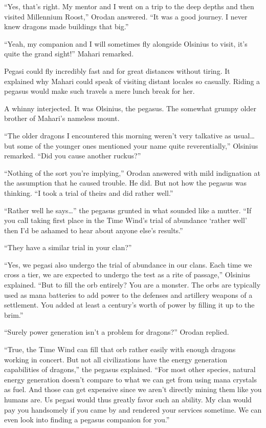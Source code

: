 \documentclass[a4paper,10pt]{book}
\begin{document}
“Yes, that’s right. My mentor and I went on a trip to the deep depths and then visited Millennium Roost,” Orodan answered. “It was a good journey. I never knew dragons made buildings that big.”\par
“Yeah, my companion and I will sometimes fly alongside Olsinius to visit, it’s quite the grand sight!” Mahari remarked.\par
Pegasi could fly incredibly fast and for great distances without tiring. It explained why Mahari could speak of visiting distant locales so casually. Riding a pegasus would make such travels a mere lunch break for her.\par
A whinny interjected. It was Olsinius, the pegasus. The somewhat grumpy older brother of Mahari’s nameless mount.\par
“The older dragons I encountered this morning weren’t very talkative as usual… but some of the younger ones mentioned your name quite reverentially,” Olsinius remarked. “Did you cause another ruckus?”\par
“Nothing of the sort you’re implying,” Orodan answered with mild indignation at the assumption that he caused trouble. He did. But not how the pegasus was thinking. “I took a trial of theirs and did rather well.”\par
“Rather well he says…” the pegasus grunted in what sounded like a mutter. “If you call taking first place in the Time Wind’s trial of abundance ‘rather well’ then I’d be ashamed to hear about anyone else’s results.”\par
“They have a similar trial in your clan?”\par
“Yes, we pegasi also undergo the trial of abundance in our clans. Each time we cross a tier, we are expected to undergo the test as a rite of passage,” Olsinius explained. “But to fill the orb entirely? You are a monster. The orbs are typically used as mana batteries to add power to the defenses and artillery weapons of a settlement. You added at least a century’s worth of power by filling it up to the brim.”\par
“Surely power generation isn’t a problem for dragons?” Orodan replied.\par
“True, the Time Wind can fill that orb rather easily with enough dragons working in concert. But not all civilizations have the energy generation capabilities of dragons,” the pegasus explained. “For most other species, natural energy generation doesn’t compare to what we can get from using mana crystals as fuel. And those can get expensive since we aren't directly mining them like you humans are. Us pegasi would thus greatly favor such an ability. My clan would pay you handsomely if you came by and rendered your services sometime. We can even look into finding a pegasus companion for you.”\par
\end{document}
